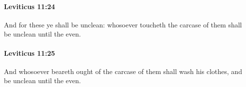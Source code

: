 		\paragraph{Leviticus 11:24} %
			\label{LEVITICUS-11-24}

			And for these ye shall be unclean: whosoever toucheth the carcase of them shall be unclean until the even.


		\paragraph{Leviticus 11:25} %
			\label{LEVITICUS-11-25}

			And whosoever beareth ought of the carcase of them shall wash his clothes, and be unclean until the even.


